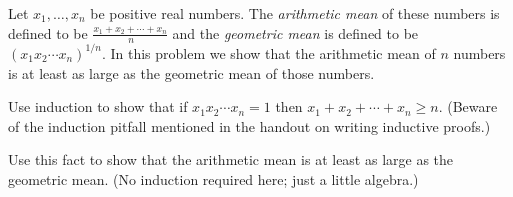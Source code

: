 \documentclass{ks-pset}
\begin{document}
\begin{solution}
\end{solution}

\begin{problem}

  Let $x_{1}, \dotsc, x_{n}$ be positive real numbers.  The \emph{arithmetic
    mean} of these numbers is defined to be $\frac{x_{1} + x_{2} + \dotsb +
  x_{n}}{\ n}$ and the \emph{geometric mean} is defined to be $(x_{1}x_{2}
  \dotsm x_{n})^{1/n}$.  In this problem we show that the arithmetic mean of
  $n$ numbers is at least as large as the geometric mean of those numbers.
  \begin{subproblems}
    \item Use induction to show that if $x_{1} x_{2} \dotsm x_{n} = 1$ then
      $x_{1} + x_{2} + \dotsb + x_{n} ≥ n$.  (Beware of the induction pitfall
      mentioned in the handout on writing inductive proofs.)

    \item Use this fact to show that the arithmetic mean is at least
      as large as the geometric mean.  (No induction required here; just
      a little algebra.)
  \end{subproblems}

\end{problem}

\begin{solution}
\end{solution}
\end{document}
